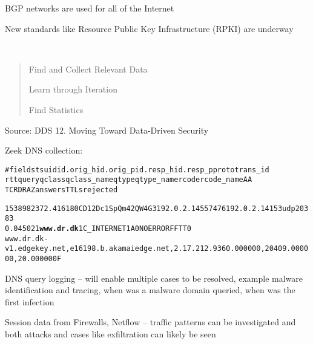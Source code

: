 \documentclass[Screen16to9,17pt]{foils}
\begin{document}


\begin{list2}
\item BGP networks are used for all of the Internet
\item New standards like Resource Public Key Infrastructure (RPKI) are underway
\end{list2}



~ 

\vspace{-3cm}

\begin{quote}
\begin{list2}
\item Find and Collect Relevant Data
\item Learn through Iteration
\item Find Statistics
\end{list2}

\end{quote}
Source: DDS 12. Moving Toward Data-Driven Security



Zeek DNS collection:
\begin{alltt}\footnotesize
#fields ts      uid     id.orig_h       id.orig_p       id.resp_h       id.resp_p       proto   trans_id
        rtt     query   qclass  qclass_name     qtype   qtype_name      rcode   rcode_name      AA
        TC      RD      RA      Z       answers TTLs    rejected

1538982372.416180	CD12Dc1SpQm42QW4G3	192.0.2.145	57476	192.0.2.141	53	udp	20383
	0.045021	{\bf www.dr.dk}	1	C_INTERNET	1	A	0	NOERROR	F	F	T	T	0
www.dr.dk-v1.edgekey.net,e16198.b.akamaiedge.net,2.17.212.93	60.000000,20409.000000,20.000000 F
\end{alltt}

\begin{list2}
\item DNS query logging -- will enable multiple cases to be resolved, example malware identification and tracing, when was a malware domain queried, when was the first infection
\item Session data from Firewalls, Netflow -- traffic patterns can be investigated and both attacks and cases like exfiltration can likely be seen
\end{list2}
\end{document}
